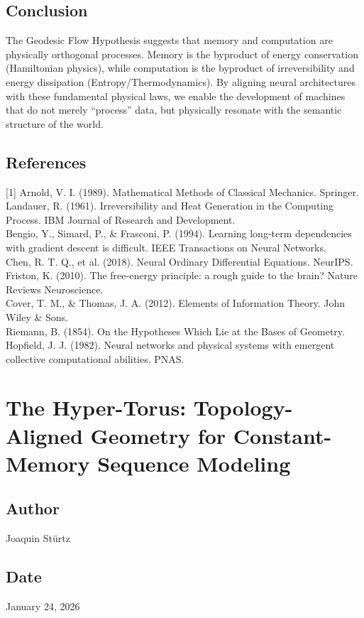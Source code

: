 \documentclass{article}
\numberwithin{equation}{section}
\begin{document}
\subsection{Conclusion}
The Geodesic Flow Hypothesis suggests that memory and computation are physically orthogonal processes. Memory is the byproduct of energy conservation (Hamiltonian physics), while computation is the byproduct of irreversibility and energy dissipation (Entropy/Thermodynamics). By aligning neural architectures with these fundamental physical laws, we enable the development of machines that do not merely ``process'' data, but physically resonate with the semantic structure of the world.

\subsection*{References}
[1] Arnold, V. I. (1989). Mathematical Methods of Classical Mechanics. Springer.\\
[2] Landauer, R. (1961). Irreversibility and Heat Generation in the Computing Process. IBM Journal of Research and Development.\\
[3] Bengio, Y., Simard, P., \& Frasconi, P. (1994). Learning long-term dependencies with gradient descent is difficult. IEEE Transactions on Neural Networks.\\
[4] Chen, R. T. Q., et al. (2018). Neural Ordinary Differential Equations. NeurIPS.\\
[5] Friston, K. (2010). The free-energy principle: a rough guide to the brain? Nature Reviews Neuroscience.\\
[6] Cover, T. M., \& Thomas, J. A. (2012). Elements of Information Theory. John Wiley \& Sons.\\
[7] Riemann, B. (1854). On the Hypotheses Which Lie at the Bases of Geometry.\\
[8] Hopfield, J. J. (1982). Neural networks and physical systems with emergent collective computational abilities. PNAS.

\section{The Hyper-Torus: Topology-Aligned Geometry for Constant-Memory Sequence Modeling}
\subsection*{Author}
Joaquin Stürtz
\subsection*{Date}
January 24, 2026
\end{document}
